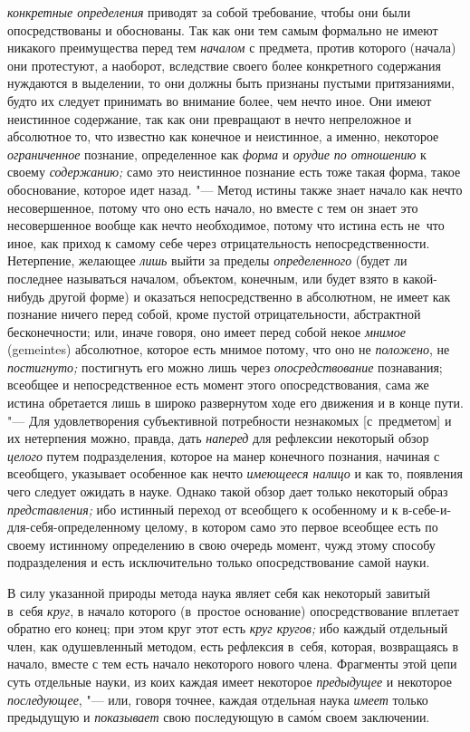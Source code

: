 {\em конкретные определения}
приводят за собой требование, чтобы они были опосредствованы
и обоснованы. Так как они тем самым формально не имеют никакого
преимущества перед тем {\em началом}
с предмета, против которого (начала) они протестуют, а
наоборот, вследствие своего более конкретного содержания нуждаются в
выделении, то они должны быть признаны пустыми притязаниями, будто их
следует принимать во внимание более, чем нечто иное. Они имеют
неистинное содержание, так как они превращают в нечто непреложное и
абсолютное то, что известно как конечное и неистинное, а именно, некоторое
{\em ограниченное} познание, определенное как {\em форма} и {\em орудие}
{\em по отношению} к своему {\em содержанию;}
само это неистинное познание есть тоже такая форма, такое
обоснование, которое идет назад. "--- Метод истины также знает
начало как нечто несовершенное, потому что оно есть начало, но вместе с тем
он знает это несовершенное вообще как нечто необходимое,
потому что истина есть не~что иное, как приход к самому себе через
отрицательность непосредственности. Нетерпение, желающее
{\em лишь} выйти за пределы {\em определенного}
(будет ли последнее называться началом, объектом, конечным,
или будет взято в какой-нибудь другой форме) и оказаться непосредственно в
абсолютном, не имеет как познание ничего перед собой, кроме пустой
отрицательности, абстрактной бесконечности; или, иначе говоря, оно имеет
перед собой некое {\em мнимое} (gemeintes) абсолютное, которое есть мнимое
потому, что оно не {\em положено}, не {\em постигнуто;}
постигнуть его можно лишь через {\em опосредствование}
познавания; всеобщее и непосредственное есть момент этого
опосредствования, сама же истина обретается лишь в широко развернутом ходе
его движения и в конце пути. "--- Для удовлетворения
субъективной потребности незнакомых [с~предметом] и их нетерпения можно,
правда, дать {\em наперед} для рефлексии некоторый обзор {\em целого} путем
подразделения, которое на манер конечного познания, начиная с всеобщего,
указывает особенное как нечто {\em имеющееся налицо} и
как то, появления чего следует ожидать в науке. Однако такой обзор дает
только некоторый образ {\em представления;} ибо
истинный переход от всеобщего к особенному и к
в-себе-и-для-себя-определенному целому, в котором само это первое всеобщее
есть по своему истинному определению в свою очередь момент, чужд этому
способу подразделения и есть исключительно только опосредствование самой науки.

В силу указанной природы метода наука являет себя как некоторый завитый в~себя
{\em круг}, в начало которого (в~простое основание) опосредствование вплетает
обратно его конец; при этом круг этот есть {\em круг кругов;} ибо каждый
отдельный член, как одушевленный методом, есть рефлексия в~себя, которая,
возвращаясь в начало, вместе с тем есть начало некоторого нового члена.
Фрагменты этой цепи суть отдельные науки, из коих каждая имеет некоторое
{\em предыдущее} и некоторое {\em последующее}, "--- или, говоря точнее,
каждая отдельная наука {\em имеет} только предыдущую и {\em показывает}
свою последующую в сам\'{о}м своем заключении.

